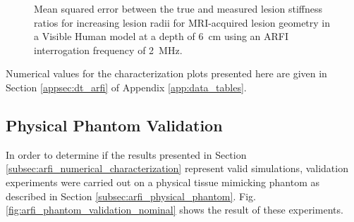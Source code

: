 			\begin{figure}[!htb]
				\centering
				\caption[ARFI imaging-acquired lesion stiffness mean squared error related to MRI-acquired lesion size in a Visible Human model]{Mean squared error between the true and measured lesion stiffness ratios for increasing lesion radii for MRI-acquired lesion geometry in a Visible Human model at a depth of \SI{6}{\cm} using an ARFI interrogation frequency of \SI{2}{\MHz}.}
				\label{fig:arfi_human_radius_mse}
			\end{figure}

			Numerical values for the characterization plots presented here are given in Section \ref{appsec:dt_arfi} of Appendix \ref{app:data_tables}.

		\FloatBarrier
		\subsection{Physical Phantom Validation}
		\label{subsec:arfi_validation_results}
			In order to determine if the results presented in Section \ref{subsec:arfi_numerical_characterization} represent valid simulations, validation experiments were carried out on a physical tissue mimicking phantom as described in Section \ref{subsec:arfi_physical_phantom}. Fig. \ref{fig:arfi_phantom_validation_nominal} shows the result of these experiments.

